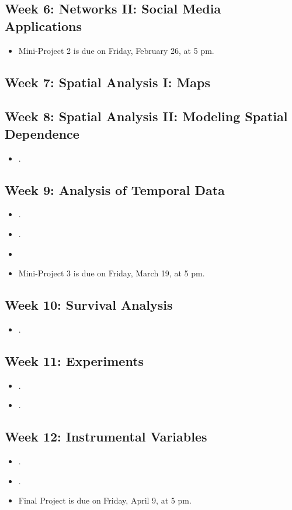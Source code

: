 \documentclass[12pt]{article}
\begin{document}
\subsection*{Week 6: Networks II: Social Media Applications}
\begin{itemize}
\item Mini-Project 2 is due on Friday, February 26, at 5 pm.
\end{itemize}

\subsection*{Week 7: Spatial Analysis I: Maps}

\subsection*{Week 8: Spatial Analysis II: Modeling Spatial Dependence}
\begin{itemize}
\item {}.
\end{itemize}

\subsection*{Week 9: Analysis of Temporal Data}
\begin{itemize}
\item {}.
\item {}.
\item {}
\item Mini-Project 3 is due on Friday, March 19, at 5 pm.
\end{itemize}

\subsection*{Week 10: Survival Analysis}
\begin{itemize}
\item {}.
\end{itemize}

\subsection*{Week 11: Experiments}
\begin{itemize}

\item {}.
\item {}.
\end{itemize}

\subsection*{Week 12: Instrumental Variables}
\begin{itemize}
\item {}.
\item {}.
\item Final Project is due on Friday, April 9, at 5 pm.
\end{itemize}
\end{document}

